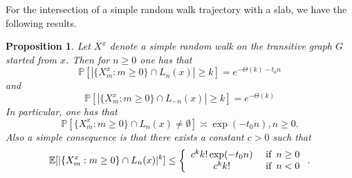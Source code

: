 \documentclass[12pt]{article}
\newtheorem{proposition}[theorem]{Proposition}
\numberwithin{equation}{section}
\newcommand{\be}{\begin{equation}}
\newcommand{\ee}{\end{equation}}
\newcommand{\1}{\mathbf{1}}
\begin{document}
 
 
 For the intersection of a simple random walk trajectory with a slab, we have the following results.
 \begin{proposition}\label{prop: intersection of a srw and a slab}
 	Let $X^x$ denote a simple random walk on the transitive graph $G$ started from $x$. Then  for $n\geq0$ one has that
 	\be\label{eq: prob of srw intersecting a high slab with at least k vertices}
 	\mathbb{P}[|\{X_m^x:m\geq0 \}\cap L_n(x)|\geq k]=e^{-\Theta(k)-t_0n}
 	\ee
 	and 
 	\be\label{eq: prob of srw intersecting a low slab with at least k vertices}
 		\mathbb{P}[|\{X_m^x:m\geq0 \}\cap L_{-n}(x)|\geq k]=e^{-\Theta(k)}
 	\ee
 	In particular, one has that
 	\be\label{eq: prob of srw intersecting a high slab}
 	\mathbb{P}[\{X_m^x:m\geq0 \}\cap L_n(x)\neq\emptyset]\asymp \exp(-t_0n),n\geq0.
 	\ee
 	Also a simple consequence is that there exists a constant $c>0$ such that
 	\be\label{eq: k-moment of intersection of srw with a  slab}
 	\mathbb{E}[|\{X_m^x:m\geq0 \}\cap L_n(x)|^k]\leq
 	\left\{\begin{array}{cc}
 	c^kk!\exp(-t_0n)& \textnormal{ if }\,n\geq0\\
 	c^kk!& \textnormal{ if }\,n<0
 	\end{array}\right..
 	\ee
 	
 \end{proposition}
\end{document}
